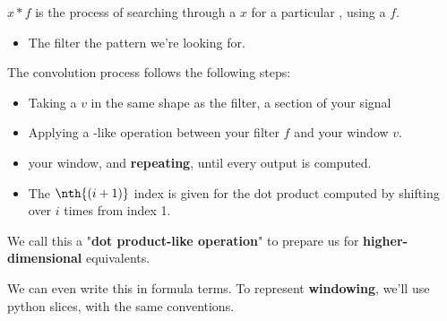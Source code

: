        \begin{definition}
             $x \ast f$ is the process of searching through a  $x$ for a particular , using a  $f$.

            \begin{itemize}
                \item The filter  the pattern we're looking for.
            \end{itemize}

            The convolution process follows the following steps:

            \begin{itemize}
                \item Taking a  $v$ in the same shape as the filter,  a section of your signal
                \item Applying a -like operation between your filter $f$ and your window $v$.
                \item {} your window, and \textbf{repeating}, until every output is computed.
            \end{itemize}

            \subsecdiv

            \begin{itemize}
                \item The $\nth{(i+1)}$ index is given for the dot product computed by shifting over $i$ times from index 1.
            \end{itemize}
        \end{definition}

        We call this a "\textbf{dot product-like operation}" to prepare us for \textbf{higher-dimensional} equivalents.

        We can even write this in formula terms. To represent \textbf{windowing}, we'll use python slices, with the same conventions.\\

